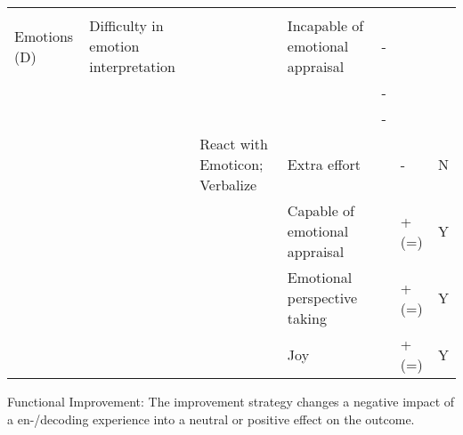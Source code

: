 \documentclass[man]{apa7}
\begin{document}
\begin{landscape}
\begin{table}
\begin{tabular}{lllllll}
                                   &                                                 &                                  &                                        &             &             &                                 \\
Emotions (D)                       & Difficulty in emotion interpretation &                                  & Incapable of emotional appraisal       & -           &             &                                 \\
                                   &                                                 &                                  &                                        & -           &             &                                 \\
                                   &                                                 &                                  &                                        & -           &             &                                 \\
                                   &                                                 & React with Emoticon; Verbalize   & Extra effort                           &             & -           & N                               \\
                                   &                                                 &                                  & Capable of emotional appraisal         &             & + (=)       & Y                               \\
                                   &                                                 &                                  & Emotional perspective taking  &             & + (=)       & Y                               \\
                                   &                                                 &                                  & Joy                                    &             & + (=)       & Y                                 \\ \bottomrule
\end{tabular}
  \begin{tablenotes}
        {\tiny
            Functional Improvement: The improvement strategy changes a negative impact of a en-/decoding experience into a neutral or positive effect on the outcome.
         }
    \end{tablenotes}
\end{table}

\end{landscape}
\end{document}
